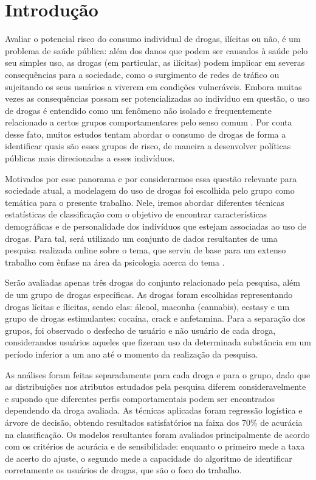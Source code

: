 \documentclass[
	article,			%
	11pt,				%
	oneside,			%
	a4paper,			%
	english,			%
	brazil,				%
	sumario=tradicional
	]{abntex2}
\begin{document}
\textual
\section{Introdução}

Avaliar o potencial risco do consumo individual de drogas, ilícitas ou não, é um problema de saúde pública: além dos danos que podem ser causados à saúde pelo seu simples uso, as drogas (em particular, as ilícitas) podem implicar em severas consequências para a sociedade, como o surgimento de redes de tráfico ou sujeitando os seus usuários a viverem em condições vulneráveis. Embora muitas vezes as consequências possam ser potencializadas ao indivíduo em questão, o uso de drogas é entendido como um fenômeno não isolado e frequentemente  relacionado a certos grupos comportamentares pelo senso comum \cite{fehrman2015}. Por conta desse fato, muitos estudos tentam abordar o consumo de drogas de forma a identificar quais são esses grupos de risco, de maneira a desenvolver políticas públicas mais direcionadas a esses indivíduos.

Motivados por esse panorama e por considerarmos essa questão relevante para sociedade atual, a modelagem do uso de drogas foi escolhida pelo grupo como temática para o presente trabalho. Nele, iremos abordar diferentes técnicas estatísticas de classificação com o objetivo de encontrar características demográficas e de personalidade dos indivíduos que estejam associadas ao uso de drogas. Para tal, será utilizado um conjunto de dados \cite{dataset_drugs} resultantes de uma pesquisa realizada online sobre o tema, que serviu de base para um extenso trabalho com ênfase na área da psicologia acerca do tema \cite{fehrman2015}.

Serão avaliadas apenas três drogas do conjunto relacionado pela pesquisa, além de um grupo de drogas específicas. As drogas foram escolhidas representando drogas lícitas e ílicitas, sendo elas: álcool, maconha (cannabis), ecstasy e um grupo de drogas estimulantes: cocaína, crack e anfetamina. Para a separação dos grupos, foi observado o desfecho de usuário e não usuário de cada droga, considerandos usuários aqueles que fizeram uso da determinada substância em um período inferior a um ano até o momento da realização da pesquisa.

As análises foram feitas separadamente para cada droga e para o grupo, dado que as distribuições nos atributos estudados pela pesquisa diferem consideravelmente e supondo que diferentes perfis comportamentais podem ser encontrados dependendo da droga avaliada. As técnicas aplicadas foram regressão logística e árvore de decisão, obtendo resultados satisfatórios na faixa dos 70\% de acurácia na classificação. Os modelos resultantes foram avaliados principalmente de acordo com os critérios de acurácia e de sensibilidade: enquanto o primeiro mede a taxa de acerto do ajuste, o segundo mede a capacidade do algoritmo de identificar corretamente os usuários de drogas, que são o foco do trabalho.
\end{document}
